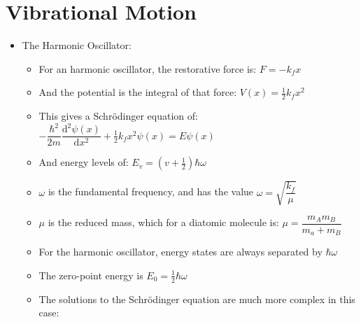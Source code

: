 \documentclass[12pt, openany, letterpaper]{memoir}
\begin{document}
\section{Vibrational Motion}
\begin{itemize}
	\item The Harmonic Oscillator:
	\begin{itemize}
		\item For an harmonic oscillator, the restorative force is: $F=-k_fx$
		\item And the potential is the integral of that force: $V(x)=\frac{1}{2}k_fx^2$
		\item This gives a Schr\"odinger equation of: $-\dfrac{\hbar^2}{2m}\dfrac{\mathrm{d}^2\psi(x)}{\mathrm{d}x^2} + \frac{1}{2}k_fx^2\psi(x)=E\psi(x)$
		\item And energy levels of: $E_v = \left(v+\frac{1}{2}\right) \hbar\omega$
		\item $\omega$ is the fundamental frequency, and has the value $\omega=\sqrt{\dfrac{k_f}{\mu}}$
		\item $\mu$ is the reduced mass, which for a diatomic molecule is: $\mu=\dfrac{m_Am_B}{m_a+m_B}$
		\item For the harmonic oscillator, energy states are always separated by $\hbar\omega$
		\item The zero-point energy is $E_0=\frac{1}{2}\hbar\omega$
		\item The solutions to the Schr\"odinger equation are much more complex in this case:
		

\end{itemize}
\end{itemize}
\end{document}
